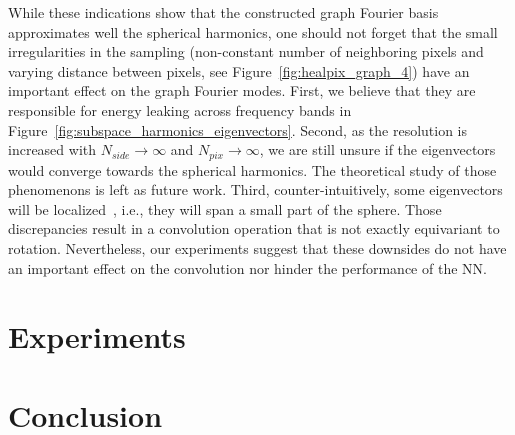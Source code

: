 \documentclass{article} %
\newcommand{\figref}[1]{Figure~\ref{fig:#1}}
\newcommand{\1}{\b{1}}              %
\newcommand{\0}{\b{0}}              %
\newcommand{\todo}[1]{{\color[rgb]{.6,.1,.6}{#1}}}
\begin{document}
While these indications show that the constructed graph Fourier basis approximates well the spherical harmonics, one should not forget that the small irregularities in the sampling (non-constant number of neighboring pixels and varying distance between pixels, see \figref{healpix_graph_4}) have an important effect on the graph Fourier modes.
First, we believe that they are responsible for energy leaking across frequency bands in \figref{subspace_harmonics_eigenvectors}.
Second, as the resolution is increased with $N_{side} \rightarrow \infty$ and $N_{pix} \rightarrow \infty$, we are still unsure if the eigenvectors would converge towards the spherical harmonics.
The theoretical study of those phenomenons is left as future work.
Third, counter-intuitively, some eigenvectors will be localized~\citep{perraudin2018global}, i.e., they will span a small part of the sphere.
Those discrepancies result in a convolution operation that is not exactly equivariant to rotation.
Nevertheless, our experiments suggest that these downsides do not have an important effect on the convolution nor hinder the performance of the NN.


\todo{new results from Martino: becomes better in BN setting, currently under study}

\todo{we have less rich operations (compared to the most general linear equivariant map) by restricting our filters to be radial, but does it matter in practice?}
\todo{isotropic filters provide invariance to the third rotation}

\section{Experiments}

\todo{the cosmo experiment}

\todo{maybe mention some preliminary results on SHREC-17: we could say performance are so far mostly similar (while being invariant to the third rotation), still under study}

\section{Conclusion}  %

\todo{Generalization vs specialization: most general is to assume no symmetries (fully connected NN).
NNs can be specialized by adding some equivariance and invariance to symmetry groups such as translation, rotation, flip, etc.
More specialized NNs are more limited in the class of functions they can approximate, but requires less samples.
Again, use the right symmetries.}
\end{document}
